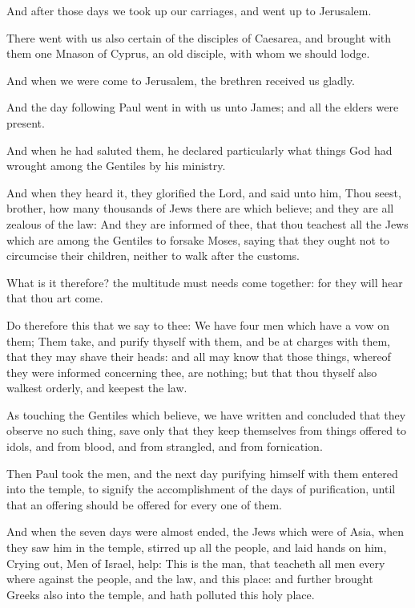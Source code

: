 \verse And after those days we took up our carriages, and went up to Jerusalem.

\verse There went with us also certain of the disciples of Caesarea, and brought with them one Mnason of Cyprus, an old disciple, with whom we should lodge.

\verse And when we were come to Jerusalem, the brethren received us gladly.

\verse And the day following Paul went in with us unto James; and all the elders were present.

\verse And when he had saluted them, he declared particularly what things God had wrought among the Gentiles by his ministry.

\verse And when they heard it, they glorified the Lord, and said unto him, Thou seest, brother, how many thousands of Jews there are which believe; and they are all zealous of the law: \verse And they are informed of thee, that thou teachest all the Jews which are among the Gentiles to forsake Moses, saying that they ought not to circumcise their children, neither to walk after the customs.

\verse What is it therefore? the multitude must needs come together: for they will hear that thou art come.

\verse Do therefore this that we say to thee: We have four men which have a vow on them; \verse Them take, and purify thyself with them, and be at charges with them, that they may shave their heads: and all may know that those things, whereof they were informed concerning thee, are nothing; but that thou thyself also walkest orderly, and keepest the law.

\verse As touching the Gentiles which believe, we have written and concluded that they observe no such thing, save only that they keep themselves from things offered to idols, and from blood, and from strangled, and from fornication.

\verse Then Paul took the men, and the next day purifying himself with them entered into the temple, to signify the accomplishment of the days of purification, until that an offering should be offered for every one of them.

\verse And when the seven days were almost ended, the Jews which were of Asia, when they saw him in the temple, stirred up all the people, and laid hands on him, \verse Crying out, Men of Israel, help: This is the man, that teacheth all men every where against the people, and the law, and this place: and further brought Greeks also into the temple, and hath polluted this holy place.

